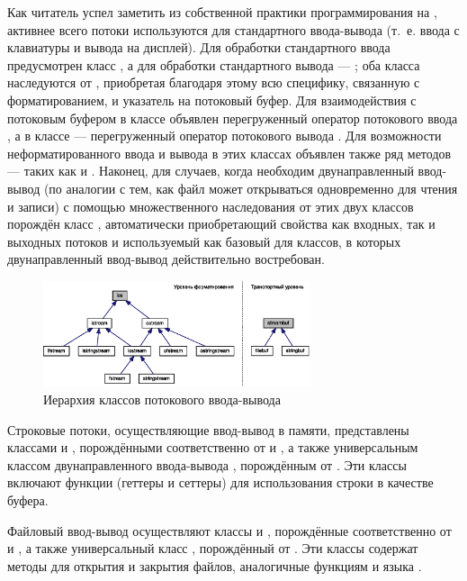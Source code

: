 Как читатель успел заметить из собственной практики программирования на , активнее всего потоки используются для
стандартного ввода-вывода (т.~е. ввода с клавиатуры и вывода на дисплей). Для обработки стандартного ввода предусмотрен
класс ,  а для обработки стандартного вывода --- ; оба класса
наследуются от , приобретая благодаря этому всю специфику, связанную с форматированием, и
указатель на потоковый буфер. Для взаимодействия с потоковым буфером в классе  объявлен
перегруженный оператор потокового ввода \Sys{{>}{>}}, а в классе
 --- перегруженный оператор потокового вывода \Sys{{<}{<}}.
Для возможности неформатированного ввода и вывода в этих классах объявлен также ряд методов --- таких как 
 и . Наконец, для случаев, когда необходим  двунаправленный
ввод-вывод (по аналогии с тем, как файл может открываться одновременно для чтения и записи) с помощью множественного
наследования от этих двух классов порождён класс , автоматически приобретающий свойства
как входных, так и выходных потоков и используемый как базовый для классов, в которых двунаправленный ввод-вывод
действительно востребован.

\begin{figure}[htb]
\begin{center}
\includegraphics[width=0.7\textwidth]{img/ris_10_4}
\caption{Иерархия классов потокового ввода-вывода}
\label{ch10:refDrawing3}
\end{center}
\end{figure}

Строковые потоки, осуществляющие ввод-вывод в памяти, представлены классами  и
, порождёнными соответственно от  и
, а также универсальным классом двунаправленного ввода-вывода
, порождённым от . Эти классы включают функции (геттеры
и сеттеры) для использования строки в качестве буфера.

Файловый ввод-вывод осуществляют классы  и , порождённые
соответственно от  и , а также универсальный класс
, порождённый от . Эти классы содержат методы для открытия и
закрытия файлов, аналогичные функциям  и  языка .

